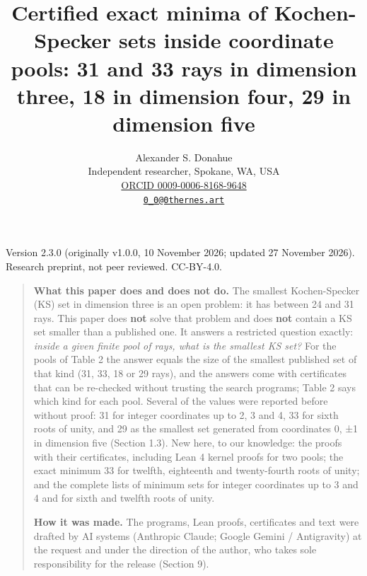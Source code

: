 \documentclass[11pt,a4paper]{article}
\title{Certified exact minima of Kochen-Specker sets inside coordinate pools: 31 and 33 rays in dimension three, 18 in dimension four, 29 in dimension five}
\author{Alexander S. Donahue\\ Independent researcher, Spokane, WA, USA\\ \href{https://orcid.org/0009-0006-8168-9648}{ORCID 0009-0006-8168-9648}\\ \href{mailto:0_0@0thernes.art}{\texttt{0\_0@0thernes.art}}}
\date{}
\begin{document}
\maketitle
\vspace{-2.5em}\begin{center}\small Version 2.3.0 (originally v1.0.0, 10 November 2026; updated 27 November 2026). Research preprint, not peer reviewed. CC-BY-4.0.\end{center}
\begin{quote}
\textbf{What this paper does and does not do.} The smallest Kochen-Specker (KS) set in dimension three is
an open problem: it has between 24 and 31 rays. This paper does \textbf{not} solve that problem and does
\textbf{not} contain a KS set smaller than a published one. It answers a restricted question exactly:
\emph{inside a given finite pool of rays, what is the smallest KS set?} For the pools of Table 2 the answer
equals the size of the smallest published set of that kind (31, 33, 18 or 29 rays), and the answers
come with certificates that can be re-checked without trusting the search programs; Table 2 says
which kind for each pool. Several of the values were reported before without proof: 31 for integer
coordinates up to 2, 3 and 4, 33 for sixth roots of unity, and 29 as the smallest set generated from
coordinates 0, ±1 in dimension five (Section 1.3). New here, to our knowledge: the proofs with their
certificates, including Lean 4 kernel proofs for two pools; the exact minimum 33 for twelfth,
eighteenth and twenty-fourth roots of unity; and the complete lists of minimum sets for integer
coordinates up to 3 and 4 and for sixth and twelfth roots of unity.

\textbf{How it was made.} The programs, Lean proofs, certificates and text were drafted by AI systems
(Anthropic Claude; Google Gemini / Antigravity) at the request and under the direction of the author,
who takes sole responsibility for the release (Section 9).
\end{quote}
\end{document}
